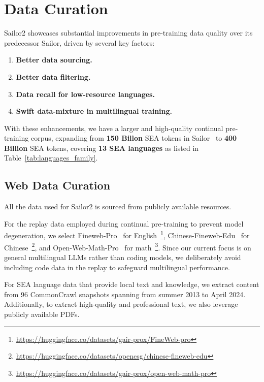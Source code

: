 \section{Data Curation}

Sailor2 showcases substantial improvements in pre-training data quality over its predecessor Sailor, driven by several key factors:

\begin{enumerate}
    \item \textbf{Better data sourcing.}
    \item \textbf{Better data filtering.}
    \item \textbf{Data recall for low-resource languages.}
    \item \textbf{Swift data-mixture in multilingual training.}
\end{enumerate}

With these enhancements, we have a larger and high-quality continual pre-training corpus, expanding from \textbf{150 Billon} SEA tokens in Sailor~\citep{dou-etal-2024-sailor} to \textbf{400 Billion} SEA tokens, covering \textbf{13 SEA languages} as listed in Table~\ref{tab:languages_family}.



\subsection{Web Data Curation}
All the data used for Sailor2 is sourced from publicly available resources.

For the replay data employed during continual pre-training to prevent model degeneration, we select Fineweb-Pro~\citep{zhou2024programming} for English~\footnote{\url{https://huggingface.co/datasets/gair-prox/FineWeb-pro}}, Chinese-Fineweb-Edu~\citep{yu2025opencsgchinesecorpusseries} for Chinese~\footnote{\url{https://huggingface.co/datasets/opencsg/chinese-fineweb-edu}}, and Open-Web-Math-Pro~\citep{zhou2024programming} for math~\footnote{\url{https://huggingface.co/datasets/gair-prox/open-web-math-pro}}. 
Since our current focus is on general multilingual LLMs rather than coding models, we deliberately avoid including code data in the replay to safeguard multilingual performance.

For SEA language data that provide local text and knowledge, we extract content from 96 CommonCrawl snapshots spanning from summer 2013 to April 2024. Additionally, to extract high-quality and professional text, we also leverage publicly available PDFs.

